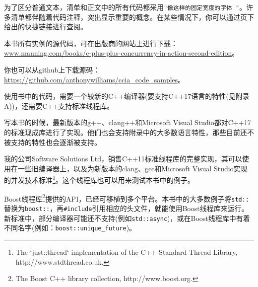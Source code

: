 
为了区分普通文本，清单和正文中的所有代码都采用\texttt{"像这样的固定宽度的字体
"}。许多清单都伴随着代码注释，突出显示重要的概念。在某些情况下，你可以通过页下给出的快捷链接进行查阅。

本书所有实例的源代码，可在出版商的网站上进行下载：\url{www.manning.com/books/c-plus-plus-concurrency-in-action-second-edition}。

你也可以从github上下载源码：\url{https://github.com/anthonywilliams/ccia_code_samples}。


使用书中的代码，需要一个较新的C++编译器(要支持C++17语言的特性(见附录A))，还需要C++支持标准线程库。

写本书的时候，最新版本的g++、clang++和Microsoft Visual Studio都对C++17的标准现成库进行了实现。他们也会支持附录中的大多数语言特性，那些目前还不被支持的特性也会逐渐被支持。

我的公司Software Solutions Ltd，销售C++11标准线程库的完整实现，其可以使用在一些旧编译器上，以及为新版本的clang、gcc和Microsoft Visual Studio实现的并发技术标准\footnote[1]{The `just::thread` implementation of the C++ Standard Thread Library, http://www.stdthread.co.uk.}。这个线程库也可以用来测试本书中的例子。

Boost线程库\footnote[2]{The Boost C++ library collection, http://www.boost.org.}提供的API，已经可移植到多个平台。本书中的大多数例子将\texttt{std::}替换为\texttt{boost::}，再\texttt{\#include}引用相应的头文件，就能使用Boost线程库来运行。新标准中，部分编译器可能还不支持(例如\texttt{std::async})，或在Boost线程库中有着不同名字(例如：\texttt{boost::unique\_future})。
